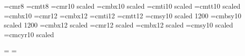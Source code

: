 \font\small=cmr8
\font\smalltt=cmtt8
\font\medium=cmr10 scaled \magstephalf
\font\mediumbx=cmbx10 scaled \magstephalf
\font\mediumit=cmti10 scaled \magstephalf
\font\mediumtt=cmtt10 scaled \magstephalf
\font\bx=cmbx10
\font\large=cmr12
\font\largebx=cmbx12
\font\largeit=cmti12
\font\largett=cmtt12
\font\largesy=cmsy10 scaled 1200
\font\largebsy=cmbsy10 scaled 1200
\font\Largebx=cmbx12 scaled \magstephalf
\font\huge=cmr12 scaled 
\font\hugebx=cmbx12 scaled 
\font\mediumsy=cmsy10 scaled \magstephalf
\font\mediumcy=cmcyr10 scaled \magstephalf

\def\bigcirc{{\largesy\char"0E}}
\def\bigcircbf{{\largebsy\char"0E}}

\newdimen\twozerosdimen
{}=\hbox{{}}
\twozerosdimen=

\newcount\chapctr
{}

\newcount\temppagecnt
{}

\newcount\sectionctr
{}

\newcount\subsectionctr
{}

\def\tocchapterentry#1#2#3{\line{\hbox to \twozerosdimen{\hss #2}. {\medium #1 \dotfill\ #3}}}
\def\tocsectionentry#1#2#3{\setbox0=\hbox{#2}\line{\hskip3em\ifdim\wd0>0pt{#2}. \fi{\medium #1 \dotfill\ #3}}}
\def\tocsubsectionentry#1#2#3{\setbox0=\hbox{#2}\line{\hskip6em\ifdim\wd0>0pt{#2}. \fi{\medium #1 \dotfill\ #3}}}

\def\Chapter#1#2{\global\advance\chapctr by 1\sectionctr=0%
\writenumberedtocentry{chapter}{\hlstart{}{bwidth=0}{#1}\Blue{#2}\hlend}{\the\chapctr}}
\def\Section#1#2{\global\advance\sectionctr by 1\edef\A{\the\chapctr .\the\sectionctr}%
\writenumberedtocentry{section}{\hlstart{}{bwidth=0}{#1}\Blue{#2}\hlend}{\A}}
\def\Subsection#1#2{\global\advance\subsectionctr by 1\edef\A{\the\chapctr .\the\sectionctr .\the\subsectionctr}%
\writenumberedtocentry{subsection}{\hlstart{}{bwidth=0}{#1}\Blue{#2}\hlend}{\A}}


\iffalse
\special{papersize=210mm, 297mm}
\hsize=210mm
\vsize=297mm
\fi

\iftrue 
{} %
\vsize=420mm
\hsize=297mm
\fi

\iffalse
\special{papersize=420mm, 297mm} %
\vsize=297mm
\hsize=420mm
\fi


